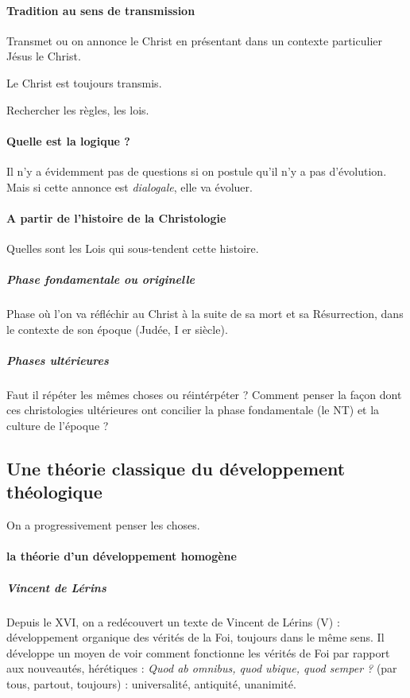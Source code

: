 \paragraph{Tradition au sens de transmission} 
\begin{Def}
  Transmet ou on annonce le Christ en présentant dans un contexte particulier Jésus le Christ.
\end{Def}
Le Christ est toujours transmis.
\begin{Def}[Théorie]
  Rechercher les règles, les lois.
\end{Def}
  
  \paragraph{Quelle est la logique ?} Il n'y a évidemment pas de questions si on postule qu'il n'y a pas d'évolution. Mais si cette annonce est \textit{dialogale}, elle va évoluer.
  
  \paragraph{A partir de l'histoire de la Christologie} Quelles sont les Lois qui sous-tendent cette histoire.
    
    \subparagraph{Phase fondamentale ou originelle} Phase où l'on va réfléchir au Christ à la suite de sa mort et sa Résurrection, dans le contexte de son époque (Judée, I er siècle).
    
    \subparagraph{Phases ultérieures} Faut il répéter les mêmes choses ou réintérpéter ? Comment penser la façon dont ces christologies ultérieures ont concilier la phase fondamentale (le NT) et la culture de l'époque ?

\subsection{Une théorie classique du développement théologique}

On a progressivement penser les choses.
    
      
      \paragraph{la théorie d'un développement homogène}
      
      \subparagraph{Vincent de Lérins} Depuis le XVI, on a redécouvert un texte de Vincent de Lérins (V)  : développement organique des vérités de la Foi, toujours dans le même sens. Il développe un moyen de voir comment fonctionne les vérités de Foi par rapport aux nouveautés, hérétiques :  \emph{Quod ab omnibus, quod ubique, quod semper ?} (par tous, partout, toujours) : universalité, antiquité, unanimité. 
      
